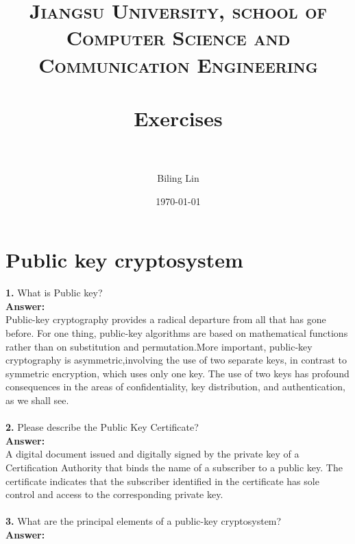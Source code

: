 \documentclass[paper=a4, fontsize=11pt]{scrartcl} %
\title{
 \normalfont \normalsize
 \textsc{Jiangsu University, school of Computer Science and Communication Engineering} \\ [25pt] %
 \horrule{0.5pt} \\[0.4cm] %
 \huge Exercises \\ %
 \horrule{2pt} \\[0.5cm] %
 }
\author{Biling Lin} %
\date{\normalsize\today} %
\numberwithin{equation}{section} %
\numberwithin{figure}{section} %
\numberwithin{table}{section} %
\begin{document}
 \maketitle %
 \section{Public key cryptosystem}
 \label{sec:pkc}



 \textbf{1.} What is Public key?\\

 \textbf{Answer:}\\

 Public-key cryptography provides a radical departure from all that has gone before. For one thing, public-key algorithms are based on mathematical functions rather than on substitution and permutation.More important, public-key cryptography is asymmetric,involving the use of two separate keys, in contrast to symmetric encryption, which uses only one key. The use of two keys has profound consequences in the areas of confidentiality, key distribution, and authentication, as we shall see.\\\\



\textbf{2.} Please describe the Public Key Certificate?\\

 \textbf{Answer:}\\

  A digital document issued and digitally signed by the private key of a Certification Authority that binds the name of a subscriber to a public key. The certificate indicates that the subscriber identified in the certificate has sole control and access to the corresponding private key.\\\\




 \textbf{3.} What are the principal elements of a public-key cryptosystem?\\

 \textbf{Answer:}
\end{document}
